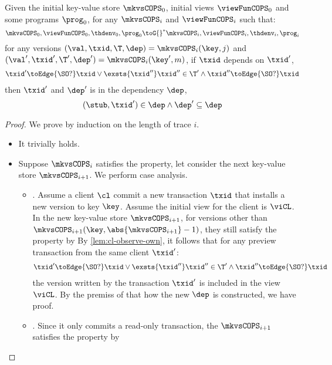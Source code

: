 \begin{lemma}
    \label{lem:cops-dep}
    Given the initial key-value store \( \mkvsCOPS_0 \), initial views \( \viewFunCOPS_0 \) and some programs \( \prog_0 \), for any \( \mkvsCOPS_i \) and \( \viewFunCOPS_i \)  such that: 
    \[
        \mkvsCOPS_0, \viewFunCOPS_0, \thdenv_0, \prog_0 {\toG{}}^* \mkvsCOPS_i, \viewFunCOPS_i, \thdenv_i, \prog_i 
    \]
    for any versions \( ( \val,\txid,\T,\dep ) = \mkvsCOPS_i(\key,j) \) and \( ( \val',\txid',\T',\dep' ) = \mkvsCOPS_i(\key',m) \), if \( \txid \) depends on \( \txid' \), \ie
    \[
        \begin{array}{@{}l@{}}
            \txid' \toEdge{\SO ?} \txid
            \lor \exsts{\txid''}
            \txid'' \in \T' \land
            \txid'' \toEdge{\SO ?} \txid
        \end{array}
    \]
    then \( \txid' \) and \( \dep' \) is in the dependency \( \dep \), \ie
    \[
        (\stub, \txid') \in \dep \land \dep' \subseteq \dep
    \]
\end{lemma}
\begin{proof}
    We prove by induction on the length of trace \( i \).
    \begin{itemize}
        \item 
        It trivially holds.
        \item  
        Suppose \( \mkvsCOPS_i \) satisfies the property, let consider the next key-value store \( \mkvsCOPS_{i+1}\).
        We perform case analysis.
        \begin{itemize}
            \item 
            .
            Assume a client \( \cl \) commit a new transaction \( \txid \) that installs a new version to key \( \key \).
            Assume the initial view for the client is \( \viCL \).
            In the new key-value store \( \mkvsCOPS_{i+1} \), for versions other than \( \mkvsCOPS_{i+1}(\key, \abs{\mkvsCOPS_{i+1}} - 1 ) \), they still satisfy the property by \ih
            By \cref{lem:cl-observe-own}, it follows that for any preview transaction from the same client \( \txid' \):
            \[
                \begin{array}{@{}l@{}}
                    \txid' \toEdge{\SO ?} \txid
                    \lor \exsts{\txid''}
                    \txid'' \in \T' \land
                    \txid'' \toEdge{\SO ?} \txid
                \end{array}
            \]
            the version written by the transaction \( \txid' \) is included in the view \( \viCL \).
            By the premiss of  that how the new \( \dep \) is constructed, we have proof.

            \item 
            .
            Since it only commits a read-only transaction, 
            the \( \mkvsCOPS_{i+1} \)  satisfies the property by \ih
        \end{itemize}
    \end{itemize}
\end{proof}

